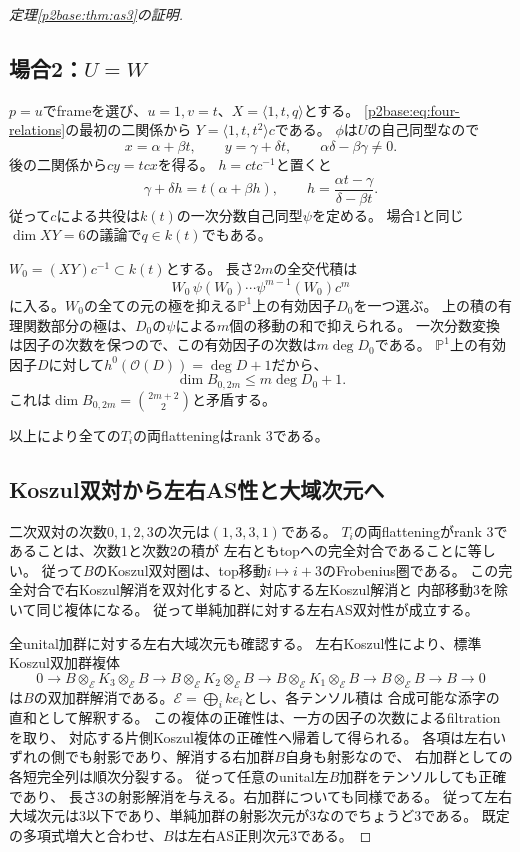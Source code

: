 \documentclass[11pt,a4paper]{ltjsarticle}
\theoremstyle{definition}
\begin{document}
\begin{proof}[定理\ref{p2base:thm:as3}の証明]
\subsection*{場合2：$U=W$}

$p=u$でframeを選び、$u=1,v=t$、$X=\langle1,t,q\rangle$とする。
\eqref{p2base:eq:four-relations}の最初の二関係から
$Y=\langle1,t,t^2\rangle c$である。
$\phi$は$U$の自己同型なので
\[
x=\alpha+\beta t,\qquad y=\gamma+\delta t,
\qquad\alpha\delta-\beta\gamma\ne0.
\]
後の二関係から$cy=tcx$を得る。
$h=ctc^{-1}$と置くと
\[
\gamma+\delta h=t(\alpha+\beta h),\qquad
h=\frac{\alpha t-\gamma}{\delta-\beta t}.
\]
従って$c$による共役は$k(t)$の一次分数自己同型$\psi$を定める。
場合1と同じ$\dim XY=6$の議論で$q\in k(t)$でもある。

$W_0=(XY)c^{-1}\subset k(t)$とする。
長さ$2m$の全交代積は
\[
W_0\,\psi(W_0)\cdots\psi^{m-1}(W_0)c^m
\]
に入る。$W_0$の全ての元の極を抑える$\mathbb P^1$上の有効因子$D_0$を一つ選ぶ。
上の積の有理関数部分の極は、$D_0$の$\psi$による$m$個の移動の和で抑えられる。
一次分数変換は因子の次数を保つので、この有効因子の次数は$m\deg D_0$である。
$\mathbb P^1$上の有効因子$D$に対して$h^0(\mathcal O(D))=\deg D+1$だから、
\[
\dim B_{0,2m}\le m\deg D_0+1.
\]
これは$\dim B_{0,2m}=\binom{2m+2}{2}$と矛盾する。

以上により全ての$T_i$の両flatteningはrank 3である。

\subsection*{Koszul双対から左右AS性と大域次元へ}

二次双対の次数$0,1,2,3$の次元は$(1,3,3,1)$である。
$T_i$の両flatteningがrank 3であることは、次数1と次数2の積が
左右ともtopへの完全対合であることに等しい。
従って$B$のKoszul双対圏は、top移動$i\mapsto i+3$のFrobenius圏である。
この完全対合で右Koszul解消を双対化すると、対応する左Koszul解消と
内部移動3を除いて同じ複体になる。
従って単純加群に対する左右AS双対性が成立する。

全unital加群に対する左右大域次元も確認する。
左右Koszul性により、標準Koszul双加群複体
\[
0\longrightarrow B\otimes_{\mathcal E}K_3\otimes_{\mathcal E}B
\longrightarrow B\otimes_{\mathcal E}K_2\otimes_{\mathcal E}B
\longrightarrow B\otimes_{\mathcal E}K_1\otimes_{\mathcal E}B
\longrightarrow B\otimes_{\mathcal E}B\longrightarrow B\longrightarrow0
\]
は$B$の双加群解消である。$\mathcal E=\bigoplus_i ke_i$とし、各テンソル積は
合成可能な添字の直和として解釈する。
この複体の正確性は、一方の因子の次数によるfiltrationを取り、
対応する片側Koszul複体の正確性へ帰着して得られる。
各項は左右いずれの側でも射影であり、解消する右加群$B$自身も射影なので、
右加群としての各短完全列は順次分裂する。
従って任意のunital左$B$加群をテンソルしても正確であり、
長さ3の射影解消を与える。右加群についても同様である。
従って左右大域次元は3以下であり、単純加群の射影次元が3なのでちょうど3である。
既定の多項式増大と合わせ、$B$は左右AS正則次元3である。
\end{proof}
\end{document}
